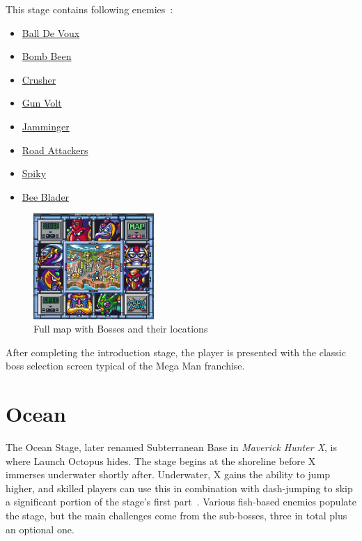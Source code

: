 This stage contains following enemies~\cite{wiki:Highway}:
\begin{itemize}
	\item \hyperlink{enem:Ball_De_Voux}{Ball De Voux}
	\item \hyperlink{enem:Bomb_Been}{Bomb Been}
	\item \hyperlink{enem:Crusher}{Crusher}
	\item \hyperlink{enem:Gun_Volt}{Gun Volt}
	\item \hyperlink{enem:Jamminger}{Jamminger}
	\item \hyperlink{enem:Road_Attackers}{Road Attackers}
	\item \hyperlink{enem:Spiky}{Spiky }
	\item \hyperlink{miniboss:Bee_Blader}{Bee Blader }
\end{itemize}
\begin{figure}[htp]
	\centering
	\includegraphics[height=4cm]{figures/X1/Full_map.png}
	\caption{Full map with Bosses and their locations}
\end{figure}
After completing the introduction stage, the player is presented with the classic boss selection screen typical of the Mega Man franchise. 


\section{Ocean}

The Ocean Stage, later renamed Subterranean Base in \textit{Maverick Hunter X}, is where Launch Octopus hides. The stage begins at the shoreline before X immerses underwater shortly after. Underwater, X gains the ability to jump higher, and skilled players can use this in combination with dash-jumping to skip a significant portion of the stage's first part~\cite{stratwiki:Ocean}. Various fish-based enemies populate the stage, but the main challenges come from the sub-bosses, three in total plus an optional one.

